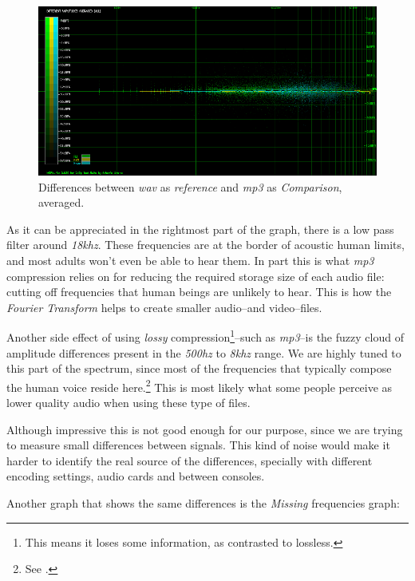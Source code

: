 \documentclass[10pt,a4paper]{report}
\newcommand{\ac}[1]{\textit{\mbox{\acrshort{#1}}}}
\newcommand{\hz}[1]{\textit{\mbox{#1\acrshort{hz}}}}
\newcommand{\khz}[1]{\textit{\mbox{#1\acrshort{khz}}}}
\begin{document}
\begin{figure}[H]
	\centering
	\includegraphics[width=1.0\linewidth]{images/interpretation/Plot6-mp3-2.png}
	\caption[WAV vs MP3 Averaged]{Differences between \ac{wav} as \textit{reference} and \ac{mp3} as \textit{Comparison}, averaged.}
	\label{fig:plot6-mp3-2}
\end{figure}

As it can be appreciated in the rightmost part of the graph, there is a low pass filter around \khz{18}. These frequencies are at the border of acoustic human limits, and most adults won't even be able to hear them. In part this is what \ac{mp3} compression relies on for reducing the required storage size of each audio file: cutting off frequencies that human beings are unlikely to hear. This is how the \textit{Fourier Transform} helps to create smaller audio--and video--files.

Another side effect of using \textit{lossy} compression\footnote{This means it loses some information, as contrasted to lossless.}--such as \ac{mp3}--is the fuzzy cloud of amplitude differences present in the \hz{500} to \khz{8} range. We are highly tuned to this part of the spectrum, since most of the frequencies that typically compose the human voice reside here.\footnote{See \cite{humanvoice}.} This is most likely what some people perceive as lower quality audio when using these type of files.

Although impressive this is not good enough for our purpose, since we are trying to measure small differences between signals. This kind of noise would make it harder to identify the real source of the differences, specially with different encoding settings, audio cards and between consoles.

Another graph that shows the same differences is the \textit{Missing} frequencies graph:
\end{document}
